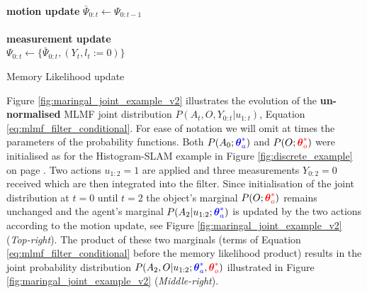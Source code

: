 \documentclass{frontiersSCNS} %
\newcommand*{\mathcolor}{}
\def\mathcolor#1#{\mathcoloraux{#1}}
\newcommand*{\mathcoloraux}[3]{%
  \protect\leavevmode
  \begingroup
    \color#1{#2}#3%
  \endgroup
}
\let\oldnl\nl%
\newcommand{\nonl}{\renewcommand{\nl}{\let\nl\oldnl}}%
\newcommand{\ThAs}{\boldsymbol{\theta}^*_a}
\newcommand{\ThOs}{\boldsymbol{\theta}^*_o}
\begin{document}
\begin{center}
\begin{minipage}{.65\linewidth}

\begin{algorithm}[H]
\label{alg:memory-motion}

\BlankLine
\nonl\hrulefill\\
\nonl\textbf{motion update} $\bar{\Psi}_{0:t} \gets \Psi_{0:t-1}$ \label{alg:motion_memory}\\
\nonl\hrulefill\\
\nonl\textbf{measurement update}\\
$\Psi_{0:t} \gets \{\bar{\Psi}_{0:t}, (Y_t,l_t:=0)\}$ 
\caption{Memory Likelihood update}

\end{algorithm} 
\end{minipage}
\end{center}

Figure \ref{fig:maringal_joint_example_v2} illustrates the evolution of the \textbf{un-normalised} MLMF joint distribution ${P(A_t,O,Y_{0:t}|u_{1:t})}$, Equation  \ref{eq:mlmf_filter_conditional}.
For ease of notation we will omit at times the parameters of the probability functions.
Both $P(A_0;\mathcolor{blue}{\ThAs})$ and $P(O;\mathcolor{red}{\ThOs})$ were initialised as for the Histogram-SLAM example in Figure \ref{fig:discrete_example} on page \pageref{fig:discrete_example}.
Two actions $u_{1:2}=1$ are applied and three measurements $Y_{0:2} = 0$ received which are then integrated into the filter. 
Since initialisation of the joint distribution at $t=0$ until $t=2$ the object's marginal $P(O;\mathcolor{red}{\ThOs})$ remains unchanged and the agent's 
marginal $P(A_2|u_{1:2};\mathcolor{blue}{\ThAs})$ is updated by the two actions according to the motion update, see 
Figure \ref{fig:maringal_joint_example_v2} (\textit{Top-right}).
The product of these two marginals (terms of Equation \ref{eq:mlmf_filter_conditional} before the memory likelihood product) results in the joint
probability distribution $P(A_2,O|u_{1:2};\mathcolor{blue}{\ThAs},\mathcolor{red}{\ThOs})$ illustrated in 
Figure \ref{fig:maringal_joint_example_v2} (\textit{Middle-right}). 

\end{document}
